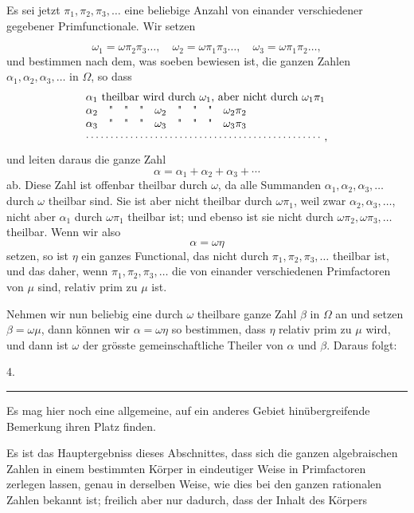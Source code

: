 Es sei jetzt $\pi_1, \pi_2, \pi_3, \ldots$ eine beliebige Anzahl von einander verschiedener gegebener Primfunctionale. Wir setzen

\[
\omega_1 = \omega\pi_2\pi_3\ldots, \quad \omega_2 = \omega\pi_1\pi_3\ldots, \quad \omega_3 = \omega\pi_1\pi_2\ldots,
\]
und bestimmen nach dem, was soeben bewiesen ist, die ganzen Zahlen $\alpha_1, \alpha_2, \alpha_3, \ldots$ in $\Omega$, so dass
\[
\begin{array}{l}
\alpha_1 \text{ theilbar wird durch } \omega_1 \text{, aber nicht durch } \omega_1\pi_1\\
\alpha_2 \quad \text{\textquotedbl} \quad \text{\textquotedbl} \quad \text{\textquotedbl} \quad \omega_2 \quad \text{\textquotedbl} \quad \text{\textquotedbl} \quad \text{\textquotedbl} \quad \omega_2\pi_2\\
\alpha_3 \quad \text{\textquotedbl} \quad \text{\textquotedbl} \quad \text{\textquotedbl} \quad \omega_3 \quad \text{\textquotedbl} \quad \text{\textquotedbl} \quad \text{\textquotedbl} \quad \omega_3\pi_3\\
\cdots\cdots\cdots\cdots\cdots\cdots\cdots\cdots\cdots\cdots\cdots\cdots\cdots\cdots\cdots\cdots,
\end{array}
\]
und leiten daraus die ganze Zahl
\[
\alpha = \alpha_1 + \alpha_2 + \alpha_3 + \cdots
\]
ab. Diese Zahl ist offenbar theilbar durch $\omega$, da alle Summanden $\alpha_1, \alpha_2, \alpha_3, \ldots$ durch $\omega$ theilbar sind. Sie ist aber nicht theilbar durch $\omega\pi_1$, weil zwar $\alpha_2, \alpha_3, \ldots$, nicht aber $\alpha_1$ durch $\omega\pi_1$ theilbar ist; und ebenso ist sie nicht durch $\omega\pi_2, \omega\pi_3, \ldots$ theilbar. Wenn wir also
\[
\alpha = \omega\eta
\]
setzen, so ist $\eta$ ein ganzes Functional, das nicht durch $\pi_1, \pi_2, \pi_3, \ldots$ theilbar ist, und das daher, wenn $\pi_1, \pi_2, \pi_3, \ldots$ die von einander verschiedenen Primfactoren von $\mu$ sind, relativ prim zu $\mu$ ist.

Nehmen wir nun beliebig eine durch $\omega$ theilbare ganze Zahl $\beta$ in $\Omega$ an und setzen $\beta = \omega\mu$, dann können wir $\alpha = \omega\eta$ so bestimmen, dass $\eta$ relativ prim zu $\mu$ wird, und dann ist $\omega$ der grösste gemeinschaftliche Theiler von $\alpha$ und $\beta$. Daraus folgt:

4. 

\begin{center}
\rule{4cm}{0.4pt}
\end{center}

Es mag hier noch eine allgemeine, auf ein anderes Gebiet hinübergreifende Bemerkung ihren Platz finden.

Es ist das Hauptergebniss dieses Abschnittes, dass sich die ganzen algebraischen Zahlen in einem bestimmten Körper in eindeutiger Weise in Primfactoren zerlegen lassen, genau in derselben Weise, wie dies bei den ganzen rationalen Zahlen bekannt ist; freilich aber nur dadurch, dass der Inhalt des Körpers
